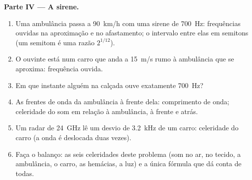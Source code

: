 \begin{problem}
\medskip
\noindent\textbf{Parte IV --- A sirene.}
\begin{enumerate}[resume]
  \item Uma ambulância passa a \qty{90}{km/h} com uma sirene de \qty{700}{Hz}:
        frequências ouvidas na aproximação e no afastamento; o intervalo
        entre elas em semitons (um semitom é uma razão $2^{1/12}$).
  \item O ouvinte está num carro que anda a \qty{15}{m/s} rumo à
        ambulância que se aproxima: frequência ouvida.
  \item Em que instante alguém na calçada ouve exatamente
        \qty{700}{Hz}?
  \item As frentes de onda da ambulância à frente dela: comprimento de onda; celeridade
        do som em relação à ambulância, à frente e atrás.
  \item Um radar de \qty{24}{GHz} lê um desvio de \qty{3.2}{kHz} de um carro:
        celeridade do carro (a onda é deslocada duas vezes).
  \item Faça o balanço: as seis celeridades deste problema (som no ar, no
        tecido, a ambulância, o carro, as hemácias, a luz) e a
        única fórmula que dá conta de todas.
\end{enumerate}
\end{problem}
